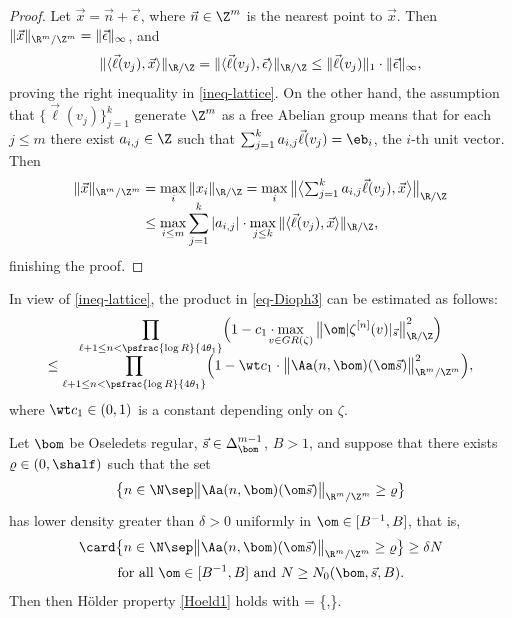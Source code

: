 \begin{proof}
Let $\vec{x} = \vec{n} + \vec{\epsilon}$, where $\vec n\in \Z^m$ is the nearest point to $\vec x$. Then $\|\vec x\|_{\R^m/\Z^m}= \|\vec{\epsilon}\|_\infty$, and
\[
\|\langle \vec\ell(v_j), \vec{x}\rangle \|_{\R/\Z} = \|\langle \vec\ell(v_j), \vec{\epsilon}\rangle \|_{\R/\Z} \le \|\vec\ell(v_j)\|_1\cdot \|\vec{\epsilon}\|_\infty,
\]
proving the right inequality in \eqref{ineq-lattice}. On the other hand, the assumption that $\{\vec\ell(v_j)\}_{j=1}^k$ generate $\Z^m$ as a free Abelian group means that for each $j\le m$ there exist $a_{i,j}\in \Z$ such that $\sum_{j=1}^k a_{i,j} \vec\ell(v_j) = \eb_i$, the $i$-th unit vector. Then
\begin{align*}
\|\vec{x}\|_{\R^m/\Z^m} &= \max_i \|x_i\|_{\R/\Z} = \max_i {\bigl\|\bigl\langle\textstyle\sum_{j=1}^k a_{i,j} \vec\ell(v_j), \vec x \bigr\rangle \bigr\|}_{\R/\Z}\\[-5pt]
&\le \max_{i\le m}\sum_{j=1}^k |a_{i,j}| \cdot
\max_{j\le k} \|\langle \vec\ell(v_j), \vec{x}\rangle \|_{\R/\Z},
\end{align*}
finishing the proof.
\end{proof}

In view of \eqref{ineq-lattice}, the product in \eqref{eq-Dioph3} can be estimated as follows:
\begin{multline}
\label{lattice}
\prod_{\ell+1\le n < \psfrac{\log R}{4\theta_1}}
\Bigl( 1 - c_1\cdot \!\!\!\! \max_{v\in GR(\zeta)}{\bigl\| \om|\zeta^{[n]}(v)|_{\vec{s}}\bigr\|}^2_{\R/\Z}\Bigr)\\[-5pt]
\le \prod_{\ell+1 \le n < \psfrac{\log R}{4\theta_1}} \Bigl( 1 - \wt c_1\cdot \bigl\|\Aa(n,\bom) (\om\vec{s})\bigr\|^2_{\R^m/\Z^m} \Bigr),
\end{multline}
where $\wt c_1\in (0,1)$ is a constant depending only on $\zeta$.

\begin{prop} \label{prop-quant}
Let $\bom$ be Oseledets regular, $\vec s\in \Delta_{\bom}^{m-1}$, $B>1$, and suppose that there exists $\varrho\in (0,\shalf)$ such that the set
\[
\bigl\{n\in \N\sep \big\|\Aa(n,\bom) (\om\vec{s})\bigr\|_{\R^m/\Z^m} \ge \varrho\bigr\}
\]
has lower density greater than $\delta>0$ uniformly in $\om\in [B^{-1},B]$, that is,
\begin{multline}
\label{eq-densi}
\card \bigl\{n\in \N\sep \big\|\Aa(n,\bom) (\om\vec{s})\bigr\|_{\R^m/\Z^m} \ge \varrho\bigr\} \ge \delta N\\
\text{for all }\om\in [B^{-1},B]\ \text{and}\ N \ge N_0(\bom,\vec s, B).
\end{multline}
Then then Hölder property \eqref{Hoeld1} holds with
\be \label{def-gamma}
\gam= \min\Bigl\{,\Bigr\}.
\ee
\end{prop}

